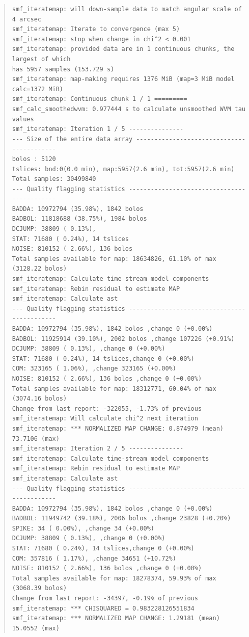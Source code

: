 \documentclass[twoside,11pt]{article}
\renewcommand{\_}{\texttt{\symbol{95}}}
\newenvironment{myquote}{\begin{quote}\begin{small}}{\end{small}\end{quote}}
\begin{document}
\begin{myquote}
\begin{verbatim}
smf_iteratemap: will down-sample data to match angular scale of 4 arcsec
smf_iteratemap: Iterate to convergence (max 5)
smf_iteratemap: stop when change in chi^2 < 0.001
smf_iteratemap: provided data are in 1 continuous chunks, the largest of which
has 5957 samples (153.729 s)
smf_iteratemap: map-making requires 1376 MiB (map=3 MiB model calc=1372 MiB)
smf_iteratemap: Continuous chunk 1 / 1 =========
smf_calc_smoothedwvm: 0.977444 s to calculate unsmoothed WVM tau values
smf_iteratemap: Iteration 1 / 5 ---------------
--- Size of the entire data array ------------------------------------------
bolos : 5120
tslices: bnd:0(0.0 min), map:5957(2.6 min), tot:5957(2.6 min)
Total samples: 30499840
--- Quality flagging statistics --------------------------------------------
BADDA: 10972794 (35.98%), 1842 bolos
BADBOL: 11818688 (38.75%), 1984 bolos
DCJUMP: 38809 ( 0.13%),
STAT: 71680 ( 0.24%), 14 tslices
NOISE: 810152 ( 2.66%), 136 bolos
Total samples available for map: 18634826, 61.10% of max (3128.22 bolos)
smf_iteratemap: Calculate time-stream model components
smf_iteratemap: Rebin residual to estimate MAP
smf_iteratemap: Calculate ast
--- Quality flagging statistics --------------------------------------------
BADDA: 10972794 (35.98%), 1842 bolos ,change 0 (+0.00%)
BADBOL: 11925914 (39.10%), 2002 bolos ,change 107226 (+0.91%)
DCJUMP: 38809 ( 0.13%), ,change 0 (+0.00%)
STAT: 71680 ( 0.24%), 14 tslices,change 0 (+0.00%)
COM: 323165 ( 1.06%), ,change 323165 (+0.00%)
NOISE: 810152 ( 2.66%), 136 bolos ,change 0 (+0.00%)
Total samples available for map: 18312771, 60.04% of max (3074.16 bolos)
Change from last report: -322055, -1.73% of previous
smf_iteratemap: Will calculate chi^2 next iteration
smf_iteratemap: *** NORMALIZED MAP CHANGE: 0.874979 (mean) 73.7106 (max)
smf_iteratemap: Iteration 2 / 5 ---------------
smf_iteratemap: Calculate time-stream model components
smf_iteratemap: Rebin residual to estimate MAP
smf_iteratemap: Calculate ast
--- Quality flagging statistics --------------------------------------------
BADDA: 10972794 (35.98%), 1842 bolos ,change 0 (+0.00%)
BADBOL: 11949742 (39.18%), 2006 bolos ,change 23828 (+0.20%)
SPIKE: 34 ( 0.00%), ,change 34 (+0.00%)
DCJUMP: 38809 ( 0.13%), ,change 0 (+0.00%)
STAT: 71680 ( 0.24%), 14 tslices,change 0 (+0.00%)
COM: 357816 ( 1.17%), ,change 34651 (+10.72%)
NOISE: 810152 ( 2.66%), 136 bolos ,change 0 (+0.00%)
Total samples available for map: 18278374, 59.93% of max (3068.39 bolos)
Change from last report: -34397, -0.19% of previous
smf_iteratemap: *** CHISQUARED = 0.983228126551834
smf_iteratemap: *** NORMALIZED MAP CHANGE: 1.29181 (mean) 15.0552 (max)

\end{verbatim}
\end{myquote}
\end{document}
